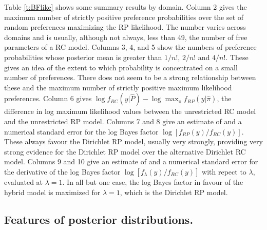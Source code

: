 \documentclass[11pt,letter]{article}
\newcommand{\Dpi}{Dirichlet RP model}
\newcommand{\DP}{Dirichlet RC model}
\begin{document}
Table \ref{t:BFlike} shows some summary results by domain.
Column 2 gives the maximum number of strictly positive preference probabilities over the set of random preferences maximizing the RP likelihood.
The number varies across domains and is usually, although not always, less than 49, the number of free parameters of a RC model.
Columns 3, 4, and 5 show the numbers of preference probabilities whose posterior mean is greater than $1/n!$, $2/n!$ and $4/n!$.
These gives an idea of the extent to which probability is concentrated on a small number of preferences.
There does not seem to be a strong relationship between these and the maximum number of strictly positive maximum likelihood preferences.
Column 6 gives $\log f_{RC}(y|\hat{P}) - \log \max_\pi f_{RP}(y|\hat{\pi})$, the difference in log maximum likelihood values between the unrestricted RC model and the unrestricted RP model.
Columns 7 and 8 give an estimate of and a numerical standard error for the log Bayes factor $\log[f_{RP}(y)/f_{RC}(y)]$.
These always favour the \Dpi{}, usually very strongly, providing very strong evidence for the \Dpi{} over the alternative \DP{}.
Columns 9 and 10 give an estimate of and a numerical standard error for the derivative of the log Bayes factor $\log[f_\lambda(y)/f_{RC}(y)]$ with repect to $\lambda$, evaluated at $\lambda=1$.
In all but one case, the log Bayes factor in favour of the hybrid model is maximized for $\lambda=1$, which is the \Dpi{}.

\begin{table}
  
  \caption{Summary results by domain. The first column shows the domain index.
The second column shows the maximum number of strictly positive preference probabilities, out of 120, for a random preference that maximizes the RP likelihood.
The third column show the difference between the RC and RP maximum log likelihoods.
The fourth and fifth columns show a numerical estimate of the Bayes factor in favour of the \Dpi{} model over the \DP{} model, and a numerical standard error for this estimate.
The sixth and seventh columns show a numerical estimate of the derivative with respect to $\lambda$ of the Bayes factor in favour of the hybrid model over the \DP{} model, at the value $\lambda = 1$.}
  \label{t:BFlike}
\end{table}

\subsection{Features of posterior distributions.}
\end{document}
